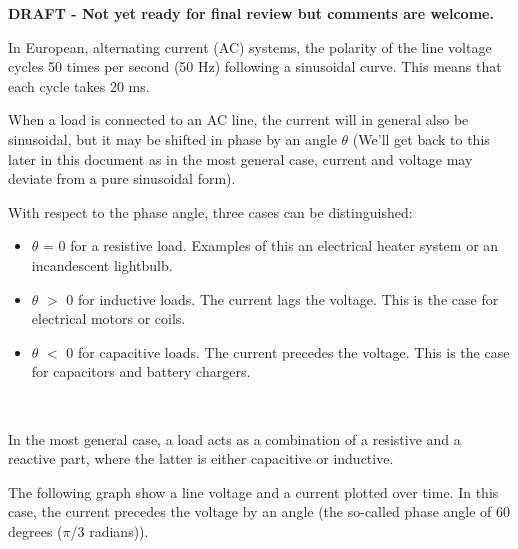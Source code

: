\documentclass[a4paper]{article}
\begin{document}
\textbf{DRAFT - Not yet ready for final review but comments are welcome.}\

In European, alternating current (AC) systems, the polarity of the line
voltage cycles 50 times  per second (50 Hz) following a sinusoidal curve. 
This means that each cycle takes 20 ms.\

When a load is connected to an AC line, the current will in general also
be sinusoidal, but it may be shifted in phase by an angle $\theta$ (We'll 
get back to this later in this document as in the most general case,
current and voltage may deviate from a pure sinusoidal form).\

With respect to the phase angle, three cases can be distinguished:

\begin{itemize}
	\item $\theta$ = 0 for a resistive load. Examples of this an electrical heater system or an incandescent lightbulb.
	\item $\theta$ $>$ 0 for inductive loads. The current lags the voltage. This is the case for electrical motors or coils.
	\item  $\theta$ $<$ 0 for capacitive loads. The current precedes the voltage. This is the case for capacitors and battery chargers.
\end{itemize}\

In the most general case, a load acts as a combination of a resistive 
and a reactive part, where the latter is either capacitive or inductive.\

The following graph show a line voltage and a current plotted over time. In
this case, the current precedes the voltage by an angle (the so-called phase
angle of 60 degrees ($\pi$/3 radians)).\


\
\end{document}
